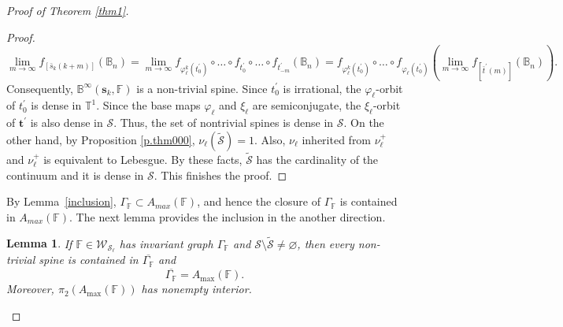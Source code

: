 \documentclass[11pt,reqno]{amsart}
\theoremstyle{plain}
\newtheorem{lemma}[theorem]{Lemma}
\newtheorem*{theorem A}{Theorem A}
\newtheorem*{theorem B}{Theorem B}
\newtheorem*{theorem C}{Theorem C}
\newtheorem*{theorem 1}{Theorem 1}
\newtheorem*{theorem 2}{Theorem 2}
\newtheorem*{theorem 3}{Theorem 3}
\numberwithin{equation}{section}
\begin{document}
\begin{proof}[Proof of Theorem \ref{thm1}]
\begin{proof}
$$\lim_{m \to \infty}f_{[\bar s_k(k+m)]}(\mathbb{B}_n)=\lim_{m \to \infty} f_{\varphi_\ell^k(t^{\prime}_0)}\circ \dots \circ f_{t^{\prime}_0}\circ \dots \circ f_{t^{\prime}_{-m}}(\mathbb{B}_n)= f_{\varphi_\ell^k(t^{\prime}_0)}\circ \dots \circ f_{\varphi_\ell(t^{\prime}_0)} (\lim_{m \to \infty} f_{[\bar t^{\prime}(m)]}(\mathbb{B}_n)).$$
Consequently, $\mathbb{B}^{\infty}(\textbf{s}_k,\mathbb{F})$ is a non-trivial spine.
Since $t_0^{\prime}$ is irrational, the $\varphi_\ell$-orbit of $t_0^{\prime}$ is dense in $\mathbb{T}^1$. Since the base maps $\varphi_\ell$ and $\xi_\ell$ are semiconjugate, the $\xi_\ell$-orbit of $\textbf{t}^{\prime}$ is also dense in $\mathcal{S}$.
Thus, the set of nontrivial spines is dense in $\mathcal{S}$.
On the other hand, by Proposition \ref{p.thm000}, $\nu_\ell(\widetilde{\mathcal{S}})=1$. Also, $\nu_\ell$ inherited from $\nu_\ell^+$ and $\nu_\ell^+$ is equivalent to Lebesgue.
By these facts, $\widetilde{\mathcal{S}}$ has the cardinality of the continuum and it is dense in $\mathcal{S}$. This finishes the proof.
\end{proof}

By Lemma~\ref{inclusion}, $\Gamma_{\mathbb{F}} \subset A_{max}(\mathbb{F})$, and hence the closure of $\Gamma_{\mathbb{F}}$ is contained in $A_{max}(\mathbb{F})$. The next lemma provides the inclusion in the another direction.

\begin{lemma}\label{geometry-short}
If $\mathbb F\in\mathcal W_{\mathcal S_\ell}$ has invariant graph $\Gamma_{\mathbb F}$ and $\mathcal S\setminus\widetilde{\mathcal S}\neq\varnothing$, then every non-trivial spine is contained in $\overline{\Gamma_{\mathbb F}}$ and
\[
\overline{\Gamma_{\mathbb F}}=A_{\max}(\mathbb F).
\]
Moreover, $\pi_2(A_{\max}(\mathbb F))$ has nonempty interior.
\end{lemma}


\end{proof}
\end{document}
